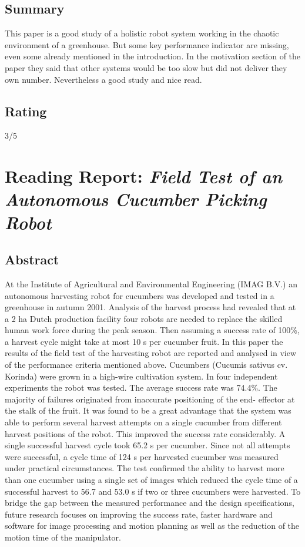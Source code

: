 \documentclass{article}
\begin{document}
\subsection*{Summary}
This paper is a good study of a holistic robot system working in the chaotic environment of a greenhouse. But some key performance indicator are missing, even some already mentioned in the introduction. 
In the motivation section of the paper they said that other systems would be too slow but did not deliver they own number. Nevertheless a good study and nice read.

\subsection*{Rating}
3/5

\section{Reading Report: \emph{Field Test of an Autonomous Cucumber Picking Robot}}
\cite{Henten2003}

\subsection*{Abstract}
At the Institute of Agricultural and Environmental Engineering (IMAG B.V.) an autonomous harvesting
robot for cucumbers was developed and tested in a greenhouse in autumn 2001. Analysis of the harvest
process had revealed that at a 2 ha Dutch production facility four robots are needed to replace the skilled
human work force during the peak season. Then assuming a success rate of 100\%, a harvest cycle might take
at most 10 s per cucumber fruit. In this paper the results of the field test of the harvesting robot are reported
and analysed in view of the performance criteria mentioned above. Cucumbers (Cucumis sativus cv. Korinda)
were grown in a high-wire cultivation system. In four independent experiments the robot was tested. The
average success rate was 74.4\%. The majority of failures originated from inaccurate positioning of the end-
effector at the stalk of the fruit. It was found to be a great advantage that the system was able to perform
several harvest attempts on a single cucumber from different harvest positions of the robot. This improved the
success rate considerably. A single successful harvest cycle took 65.2 s per cucumber. Since not all attempts
were successful, a cycle time of 124 s per harvested cucumber was measured under practical circumstances. The
test confirmed the ability to harvest more than one cucumber using a single set of images which reduced the
cycle time of a successful harvest to 56.7 and 53.0 s if two or three cucumbers were harvested. To bridge the
gap between the measured performance and the design specifications, future research focuses on improving the
success rate, faster hardware and software for image processing and motion planning as well as the reduction
of the motion time of the manipulator.
\end{document}
